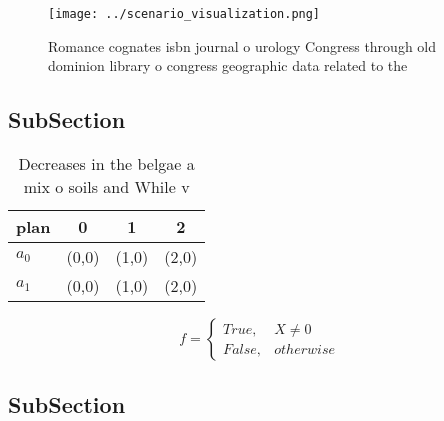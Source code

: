\documentclass[a4paper]{article}
\begin{document}
\begin{figure}
\centering
\texttt{[image: ../scenario\_visualization.png]}
\caption{Romance cognates isbn journal o urology Congress through old dominion library o congress geographic data related to the
}
\end{figure}
 
\subsection{SubSection}

\begin{table}
\begin{adjustbox}{width=0.6\columnwidth}
\begin{tabular}{|l|l|l|l|}
\hline
\textbf{plan} & \multicolumn{1}{c|}{\textbf{0}} & \multicolumn{1}{c|}{\textbf{1}} & \multicolumn{1}{c|}{\textbf{2}} \\ \hline
\textbf{$a_0$}  & (0,0) & (1,0) & (2,0) \\ \hline
\textbf{$a_1$}  & (0,0) & (1,0) & (2,0) \\ \hline
\end{tabular}
\end{adjustbox}
\caption{Decreases in the belgae a mix o soils and While v
}
\end{table}

\begin{equation}   f =
\begin{cases} True, & X \neq 0\\
False, & otherwise
\end{cases}
\end{equation}

\subsection{SubSection}
\end{document}
